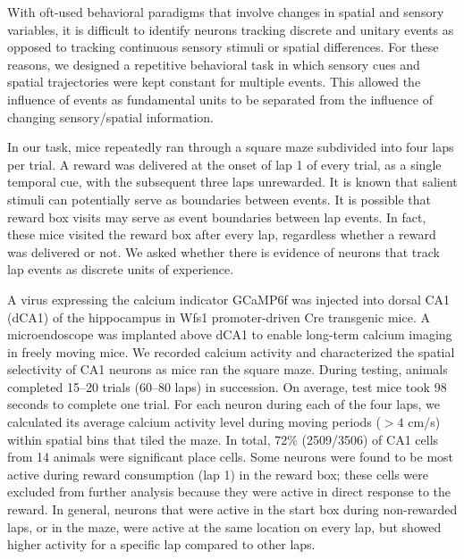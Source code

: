 With oft-used behavioral paradigms that involve changes in spatial and sensory variables, it is difficult to identify neurons tracking discrete and unitary events as opposed to tracking continuous sensory stimuli or spatial differences. For these reasons, we designed a repetitive behavioral task in which sensory cues and spatial trajectories were kept constant for multiple events. This allowed the influence of events as fundamental units to be separated from the influence of changing sensory/spatial information.

In our task, mice repeatedly ran through a square maze subdivided into four laps per trial. A reward was delivered at the onset of lap 1 of every trial, as a single temporal cue, with the subsequent three laps unrewarded. It is known that salient stimuli can potentially serve as boundaries between events. It is possible that reward box visits may serve as event boundaries between lap events. In fact, these mice visited the reward box after every lap, regardless whether a reward was delivered or not. We asked whether there is evidence of neurons that track lap events as discrete units of experience.

A virus expressing the calcium indicator GCaMP6f was injected into dorsal CA1 (dCA1) of the hippocampus in Wfs1 promoter-driven Cre transgenic mice. A microendoscope was implanted above dCA1 to enable long-term calcium imaging in freely moving mice. We recorded calcium activity and characterized the spatial selectivity of CA1 neurons as mice ran the square maze. During testing, animals completed 15--20 trials (60--80 laps) in succession. On average, test mice took 98 seconds to complete one trial. For each neuron during each of the four laps, we calculated its average calcium activity level during moving periods ($> 4$ cm/s) within spatial bins that tiled the maze. In total, 72\% (2509/3506) of CA1 cells from 14 animals were significant place cells. Some neurons were found to be most active during reward consumption (lap 1) in the reward box; these cells were excluded from further analysis because they were active in direct response to the reward. In general, neurons that were active in the start box during non-rewarded laps, or in the maze, were active at the same location on every lap, but showed higher activity for a specific lap compared to other laps.

